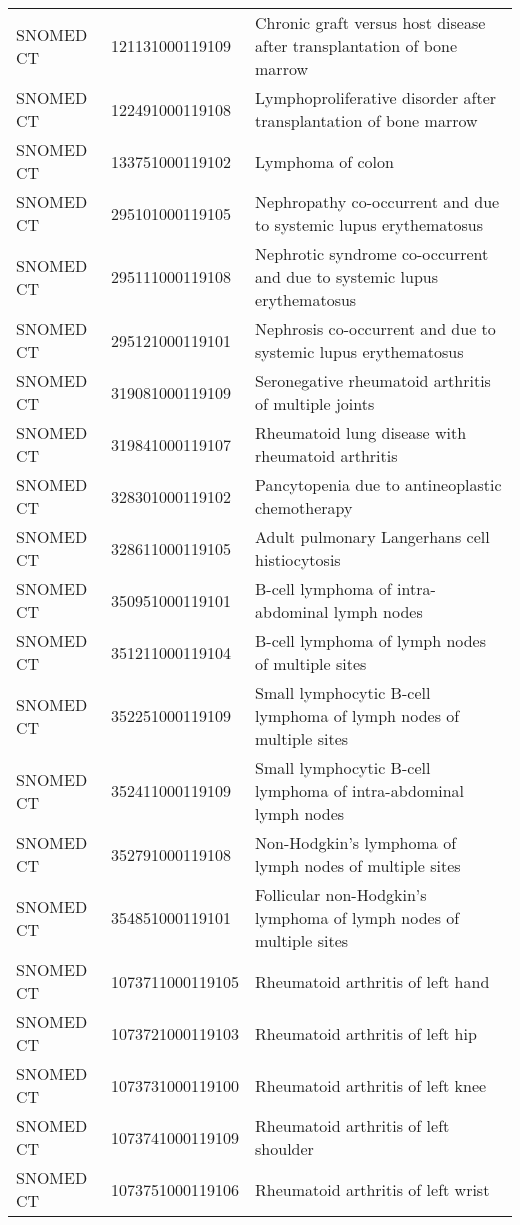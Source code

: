 \begin{table}[ht]
\begin{tabular}{lll}
  SNOMED CT & 121131000119109 & Chronic graft versus host disease after transplantation of bone marrow \\ 
  SNOMED CT & 122491000119108 & Lymphoproliferative disorder after transplantation of bone marrow \\ 
  SNOMED CT & 133751000119102 & Lymphoma of colon \\ 
  SNOMED CT & 295101000119105 & Nephropathy co-occurrent and due to systemic lupus erythematosus \\ 
  SNOMED CT & 295111000119108 & Nephrotic syndrome co-occurrent and due to systemic lupus erythematosus \\ 
  SNOMED CT & 295121000119101 & Nephrosis co-occurrent and due to systemic lupus erythematosus \\ 
  SNOMED CT & 319081000119109 & Seronegative rheumatoid arthritis of multiple joints \\ 
  SNOMED CT & 319841000119107 & Rheumatoid lung disease with rheumatoid arthritis \\ 
  SNOMED CT & 328301000119102 & Pancytopenia due to antineoplastic chemotherapy \\ 
  SNOMED CT & 328611000119105 & Adult pulmonary Langerhans cell histiocytosis \\ 
  SNOMED CT & 350951000119101 & B-cell lymphoma of intra-abdominal lymph nodes \\ 
  SNOMED CT & 351211000119104 & B-cell lymphoma of lymph nodes of multiple sites \\ 
  SNOMED CT & 352251000119109 & Small lymphocytic B-cell lymphoma of lymph nodes of multiple sites \\ 
  SNOMED CT & 352411000119109 & Small lymphocytic B-cell lymphoma of intra-abdominal lymph nodes \\ 
  SNOMED CT & 352791000119108 & Non-Hodgkin's lymphoma of lymph nodes of multiple sites \\ 
  SNOMED CT & 354851000119101 & Follicular non-Hodgkin's lymphoma of lymph nodes of multiple sites \\ 
  SNOMED CT & 1073711000119105 & Rheumatoid arthritis of left hand \\ 
  SNOMED CT & 1073721000119103 & Rheumatoid arthritis of left hip \\ 
  SNOMED CT & 1073731000119100 & Rheumatoid arthritis of left knee \\ 
  SNOMED CT & 1073741000119109 & Rheumatoid arthritis of left shoulder \\ 
  SNOMED CT & 1073751000119106 & Rheumatoid arthritis of left wrist \\ 

\end{tabular}
\end{table}
